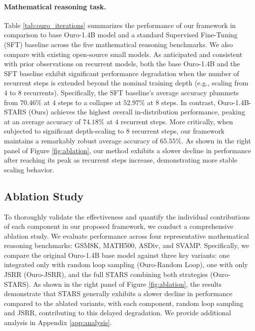 \paragraph{Mathematical reasoning task.}
Table \ref{tab:ouro_iterations} summarizes the performance of our framework in comparison to base Ouro-1.4B model and a standard Supervised Fine-Tuning (SFT) baseline across the five mathematical reasoning benchmarks.
We also compare with existing open-source small models.
As anticipated and consistent with prior observations on recurrent models, both the base Ouro-1.4B and the SFT baseline exhibit significant performance degradation when the number of recurrent steps is extended beyond the nominal training depth (e.g., scaling from $4$ to $8$ recurrents). Specifically, the SFT baseline's average accuracy plummets from $70.46\%$ at $4$ steps to a collapse at $52.97\%$ at $8$ steps.
In contrast, Ouro-1.4B-STARS (Ours) achieves the highest overall in-distribution performance, peaking at an average accuracy of $74.18\%$ at $4$ recurrent steps. More critically, when subjected to significant depth-scaling to 8 recurrent steps, our framework maintains a remarkably robust average accuracy of $65.55\%$. 
As shown in the right panel of Figure \ref{fig:ablation}, our method exhibits a slower decline in performance after reaching its peak as recurrent steps increase, demonstrating more stable scaling behavior.

\subsection{Ablation Study}
To thoroughly validate the effectiveness and quantify the individual contributions of each component in our proposed framework, we conduct a comprehensive ablation study. We evaluate performance across four representative mathematical reasoning benchmarks: GSM8K, MATH500, ASDiv, and SVAMP. Specifically, we compare the original Ouro-1.4B base model against three key variants: one integrated only with random loop sampling (Ouro-Random Loop), one with only JSRR (Ouro-JSRR), and the full STARS combining both strategies (Ouro-STARS). As shown in the right panel of Figure \ref{fig:ablation}, the results demonstrate that STARS generally exhibits a slower decline in performance compared to the ablated variants, with each component, random loop sampling and JSRR, contributing to this delayed degradation. We provide additional analysis in Appendix \ref{app:analysis}.
%

